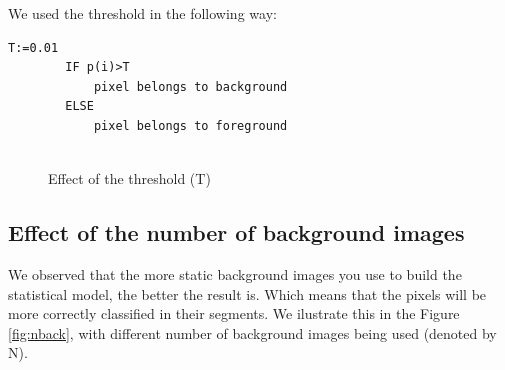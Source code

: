 \documentclass{article}
\begin{document}
	We used the threshold in the following way:

	\begin{lstlisting}[frame=single]
		T:=0.01
		IF p(i)>T
			pixel belongs to background
		ELSE
			pixel belongs to foreground
		
	\end{lstlisting}

	\begin{figure}[H]
		  \centering
		  \caption{Effect of the threshold (T)}
		  \label{fig:threshold}
	\end{figure}

\subsection{Effect of the number of background images}

	We observed that the more static background images you use to build the statistical model, the better the result is. Which means that the pixels will be more correctly classified in their segments. We ilustrate this in the Figure \ref{fig:nback}, with different number of background images being used (denoted by N). 
	
\end{document}
